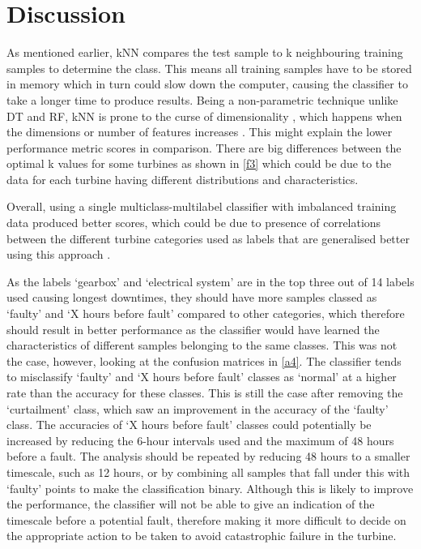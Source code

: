 \chapter{Discussion}\label{c4}

As mentioned earlier, kNN compares the test sample to k neighbouring training samples to determine the class. This means all training samples have to be stored in memory \cite{Gutie} which in turn could slow down the computer, causing the classifier to take a longer time to produce results. Being a non-parametric technique \cite{16N} unlike DT and RF, kNN is prone to the curse of dimensionality \cite{Gutie}, which happens when the dimensions or number of features increases \cite{Distr}. This might explain the lower performance metric scores in comparison. There are big differences between the optimal k values for some turbines as shown in \autoref{f3} which could be due to the data for each turbine having different distributions and characteristics.

Overall, using a single multiclass-multilabel classifier with imbalanced training data produced better scores, which could be due to presence of correlations between the different turbine categories used as labels that are generalised better using this approach \cite{110}.

As the labels `gearbox' and `electrical system' are in the top three out of 14 labels used causing longest downtimes, they should have more samples classed as `faulty' and `X hours before fault' compared to other categories, which therefore should result in better performance as the classifier would have learned the characteristics of different samples belonging to the same classes. This was not the case, however, looking at the confusion matrices in \autoref{a4}. The classifier tends to misclassify `faulty' and `X hours before fault' classes as `normal' at a higher rate than the accuracy for these classes. This is still the case after removing the `curtailment' class, which saw an improvement in the accuracy of the `faulty' class. The accuracies of `X hours before fault' classes could potentially be increased by reducing the 6-hour intervals used and the maximum of 48 hours before a fault. The analysis should be repeated by reducing 48 hours to a smaller timescale, such as 12 hours, or by combining all samples that fall under this with `faulty' points to make the classification binary. Although this is likely to improve the performance, the classifier will not be able to give an indication of the timescale before a potential fault, therefore making it more difficult to decide on the appropriate action to be taken to avoid catastrophic failure in the turbine.

